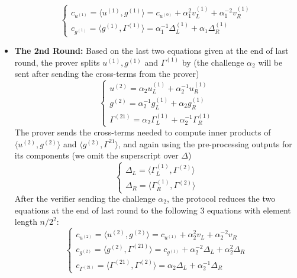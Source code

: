 \documentclass{article}
\begin{document}
\begin{itemize}
\begin{equation*}
\begin{cases}
c_{u^{(1)}}  = \langle u^{(1)}, g^{(1)} \rangle = c_{u^{(0)}} + \alpha_1^2 v^{(1)}_L + \alpha_1^{-2} v^{(1)}_R \\
c_{g^{(1)}}  = \langle g^{(1)}, \Gamma^{(1)} \rangle = \alpha_1^{-1} \Delta_L^{(1)} + \alpha_1 \Delta^{(1)}_R
\end{cases}
\end{equation*}
\item \textbf{The 2nd Round: } Based on the last two equations given at the end of last round, the prover splits $u^{(1)}, g^{(1)}$ and $\Gamma^{(1)}$ by (the challenge $\alpha_2$ will be sent after sending the cross-terms from the prover)
\begin{equation*}
\begin{cases}
u^{(2)} = \alpha_2 u^{(1)}_L + \alpha_{2}^{-1} u^{(1)}_R \\
g^{(2)} = \alpha_2^{-1} g^{(1)}_L + \alpha_{2} g^{(1)}_{R} \\
\Gamma^{(21)} = \alpha_2 \Gamma^{(1)}_L + \alpha_2^{-1} \Gamma^{(1)}_R
\end{cases}
\end{equation*}
The prover sends the cross-terms needed to compute inner products of $\langle u^{(2)}, g^{(2)}\rangle$ and $\langle g^{(2)}, \Gamma^{21} \rangle$, and again using the pre-processing outputs for its components (we omit the superscript over $\Delta$)
\begin{equation*}
\begin{cases}
\Delta_L = \langle \Gamma^{(1)}_L, \Gamma^{(2)} \rangle \\
\Delta_R = \langle \Gamma^{(1)}_R, \Gamma^{(2)} \rangle
\end{cases}
\end{equation*}
After the verifier sending the challenge $\alpha_2$, the protocol reduces the two equations at the end of last round to the following $3$ equations with element length $n/2^2$:
\begin{equation*}
\begin{cases}
c_{u^{(2)}} = \langle u^{(2)}, g^{(2)} \rangle = c_{u^{(1)}} + \alpha_2^2 v_L + \alpha_2^{-2} v_R \\
c_{g^{(2)}} = \langle g^{(2)}, \Gamma^{(21)} \rangle = c_{g^{(1)}} + \alpha_2^{-2} \Delta_L + \alpha_2^2 \Delta_R \\
c_{\Gamma^{(21)}} = \langle \Gamma^{(21)}, \Gamma^{(2)} \rangle = \alpha_2 \Delta_L + \alpha_2^{-1} \Delta_R
\end{cases}
\end{equation*}

\end{itemize}
\end{document}
